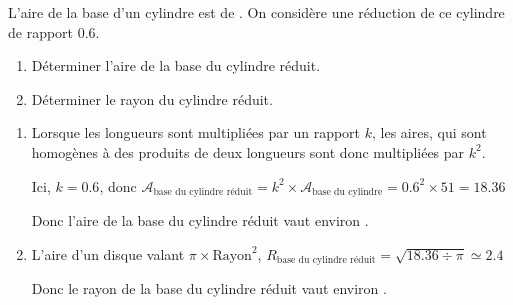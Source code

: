 \begin{exercice*}
    L'aire de la base d'un cylindre est de .
    On considère une réduction de ce cylindre de rapport \num{0.6}.
    \begin{enumerate}
        \item Déterminer l'aire de la base du cylindre réduit.
        \item Déterminer le rayon du cylindre réduit.
    \end{enumerate}
\end{exercice*}
\begin{corrige}
    \begin{enumerate}
        \item Lorsque les longueurs sont multipliées par un rapport $k$, les aires, qui sont homogènes à 
    des produits de deux longueurs sont donc multipliées par $k^2$.

    Ici, $k=\num{0.6}$, donc $\mathcal{A}_{\text{base du cylindre réduit}} = k^2\times \mathcal{A}_{\text{base du cylindre}} = \num{0.6}^2\times 51 = \num{18.36}$

    Donc l'aire de la base du cylindre réduit vaut environ .
        \item L'aire d'un disque valant $\pi \times \text{Rayon}^2$, $R_\text{base du cylindre réduit}=\sqrt{\num{18.36}\div\pi} \simeq \num{2.4}$

    Donc le rayon de la base du cylindre réduit vaut environ .
    \end{enumerate}
\end{corrige}

